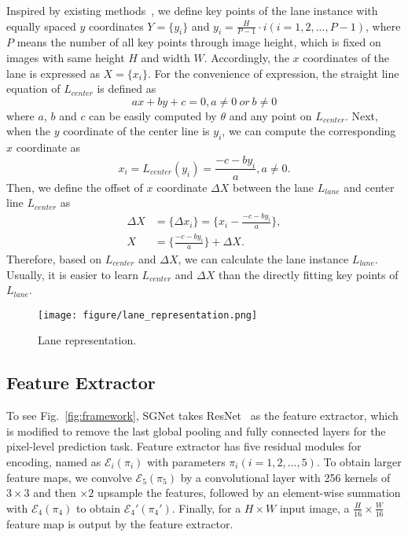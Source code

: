 \documentclass{article}
\begin{document}
Inspired by existing methods~\cite{li2019line,chen2019pointlanenet,qin2020ultra}, we define key points of the lane instance with equally spaced $y$ coordinates $Y=\{y_i\}$ and $y_i = \frac{H}{P - 1} \cdot i (i=1,2,...,P-1)$, where $P$ means the number of all key points through image height, which is fixed on images with same height $H$ and width $W$. Accordingly, the $x$ coordinates of the lane is expressed as $X = \{x_i\}$. For the convenience of expression, the straight line equation of $L_{center}$ is defined as 
\begin{equation}\label{eq:straight_line}
ax + by + c = 0, a\neq 0 \ or \ b \neq 0 
\end{equation}
where $a$, $b$ and $c$ can be easily computed by $\theta$ and any point on $L_{center}$. Next, when the $y$ coordinate of the center line is $y_i$, we can compute the corresponding $x$ coordinate as
\begin{equation}\label{eq:straight_line}
x_i = L_{center}(y_i) = \frac{-c-by_i}{a}, a \neq 0.
\end{equation}
Then, we define the offset of $x$ coordinate $\Delta X$   between the lane $L_{lane}$ and center line $L_{center}$ as
\begin{equation}\label{eq:Delta_x}
\begin{aligned}
\Delta X &=  \{\Delta x_i\} = \{ x_i - \frac{-c-by_i}{a} \},  \\
X &= \{\frac{-c-by_i}{a} \} + \Delta X.
\end{aligned}
\end{equation}
Therefore, based on $L_{center}$ and $\Delta X$, we can calculate the lane instance $L_{lane}$. Usually, it is easier to learn $L_{center}$ and $\Delta X$ than the directly fitting key points of $L_{lane}$.

\begin{figure}[t]
\centering
\texttt{[image: figure/lane\_representation.png]}
\caption{Lane representation.}
\label{fig:lane_representation}
\end{figure}

\subsection{Feature Extractor}
To see Fig.~\ref{fig:framework}, SGNet takes ResNet~\cite{he2016deep} as the feature extractor, which is modified to remove the last global pooling and fully connected layers for the pixel-level
prediction task. Feature extractor has five residual modules for encoding, named as $\mathcal{E}_i(\pi_i)$ with parameters $\pi_i (i=1,2,...,5)$. To obtain larger feature maps, we convolve $\mathcal{E}_5(\pi_5)$ by a convolutional layer with 256 kernels of $3 \times 3$ and then $\times2$ upsample the features, followed by an element-wise summation with $\mathcal{E}_4(\pi_4)$ to obtain $\mathcal{E}_4'(\pi_4')$. Finally, for a $H \times W$ input image, a $\frac{H}{16} \times \frac{W}{16}$ feature map is output by the feature extractor.
\end{document}
